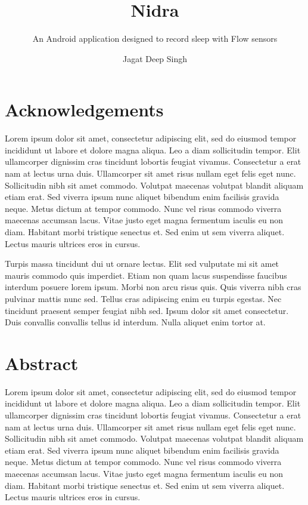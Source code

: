 \documentclass[UKenglish]{ifimaster}  %
\title{Nidra}
\subtitle{An Android application designed to record sleep with Flow sensors}
\author{Jagat Deep Singh}
\begin{document}
\duoforside[dept={Department of Informatics},   %
  program={Network and system administration},  %
  short]                                        %

\frontmatter{}
\chapter*{Acknowledgements}
    Lorem ipsum dolor sit amet, consectetur adipiscing elit, sed do eiusmod tempor incididunt ut labore et dolore magna aliqua. Leo a diam sollicitudin tempor. Elit ullamcorper dignissim cras tincidunt lobortis feugiat vivamus. Consectetur a erat nam at lectus urna duis. Ullamcorper sit amet risus nullam eget felis eget nunc. Sollicitudin nibh sit amet commodo. Volutpat maecenas volutpat blandit aliquam etiam erat. Sed viverra ipsum nunc aliquet bibendum enim facilisis gravida neque. Metus dictum at tempor commodo. Nunc vel risus commodo viverra maecenas accumsan lacus. Vitae justo eget magna fermentum iaculis eu non diam. Habitant morbi tristique senectus et. Sed enim ut sem viverra aliquet. Lectus mauris ultrices eros in cursus.

    Turpis massa tincidunt dui ut ornare lectus. Elit sed vulputate mi sit amet mauris commodo quis imperdiet. Etiam non quam lacus suspendisse faucibus interdum posuere lorem ipsum. Morbi non arcu risus quis. Quis viverra nibh cras pulvinar mattis nunc sed. Tellus cras adipiscing enim eu turpis egestas. Nec tincidunt praesent semper feugiat nibh sed. Ipsum dolor sit amet consectetur. Duis convallis convallis tellus id interdum. Nulla aliquet enim tortor at.

\chapter*{Abstract}
    Lorem ipsum dolor sit amet, consectetur adipiscing elit, sed do eiusmod tempor incididunt ut labore et dolore magna aliqua. Leo a diam sollicitudin tempor. Elit ullamcorper dignissim cras tincidunt lobortis feugiat vivamus. Consectetur a erat nam at lectus urna duis. Ullamcorper sit amet risus nullam eget felis eget nunc. Sollicitudin nibh sit amet commodo. Volutpat maecenas volutpat blandit aliquam etiam erat. Sed viverra ipsum nunc aliquet bibendum enim facilisis gravida neque. Metus dictum at tempor commodo. Nunc vel risus commodo viverra maecenas accumsan lacus. Vitae justo eget magna fermentum iaculis eu non diam. Habitant morbi tristique senectus et. Sed enim ut sem viverra aliquet. Lectus mauris ultrices eros in cursus.
\end{document}
